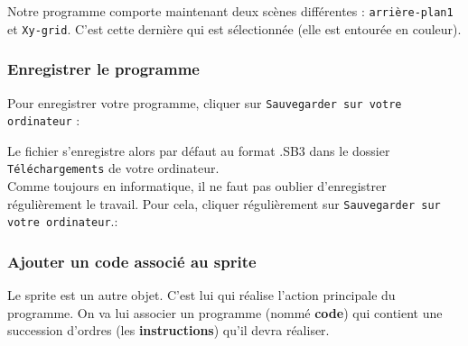 
Notre programme comporte maintenant deux scènes différentes : \texttt{arrière-plan1} et \texttt{Xy-grid}. C'est cette dernière qui est sélectionnée (elle est entourée en couleur).







\subsubsection{Enregistrer le programme}

Pour enregistrer votre programme, cliquer sur \texttt{Sauvegarder sur votre ordinateur} :


Le fichier s'enregistre alors par défaut au format .SB3 dans le dossier \texttt{Téléchargements} de votre ordinateur.\\




Comme toujours en informatique, il ne faut pas oublier d'enregistrer régulièrement le travail. Pour cela, cliquer régulièrement sur \texttt{Sauvegarder sur votre ordinateur}.:










\subsubsection{Ajouter un code associé au sprite}\label{ScriptLutin}

Le sprite est un autre objet. C'est lui qui réalise l'action principale du programme. On va lui associer un programme (nommé \textbf{code}) qui contient une succession d'ordres (les \textbf{instructions}) qu'il devra réaliser.  \\

